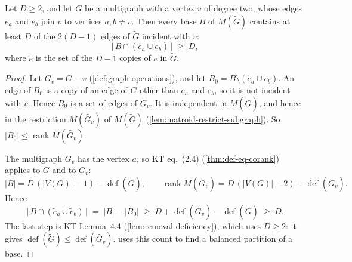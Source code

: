 \begin{lemma}
  \label{lem:base-vfiber-count}
  \leanok
  Let $D \ge 2$, and let $G$ be a multigraph with a vertex $v$ of degree
  two, whose edges $e_a$ and $e_b$ join $v$ to vertices $a, b \neq v$.
  Then every base $B$ of $M(\tilde G)$ contains at least $D$ of the
  $2(D - 1)$ edges of $\tilde G$ incident with $v$:
  \[
    \bigl|\, B \cap (\tilde e_a \cup \tilde e_b)\,\bigr| \;\ge\; D,
  \]
  where $\tilde e$ is the set of the $D - 1$ copies of $e$ in
  $\tilde G$.
\end{lemma}
\begin{proof}
  \leanok
  Let $G_v = G - v$ (\cref{def:graph-operations}), and let
  $B_0 = B \setminus (\tilde e_a \cup \tilde e_b)$. An edge of $B_0$ is
  a copy of an edge of $G$ other than $e_a$ and $e_b$, so it is not
  incident with $v$. Hence $B_0$ is a set of edges of
  $\widetilde{G_v}$. It is independent in $M(\tilde G)$, and hence in
  the restriction $M(\widetilde{G_v})$ of $M(\tilde G)$
  (\cref{lem:matroid-restrict-subgraph}). So
  $|B_0| \le \operatorname{rank} M(\widetilde{G_v})$.

  The multigraph $G_v$ has the vertex $a$, so KT eq.~(2.4)
  (\cref{thm:def-eq-corank}) applies to $G$ and to $G_v$:
  \[
    |B| = D\,(|V(G)| - 1) - \operatorname{def}(\tilde G), \qquad
    \operatorname{rank} M(\widetilde{G_v}) = D\,(|V(G)| - 2) -
    \operatorname{def}(\widetilde{G_v}).
  \]
  Hence
  \[
    \bigl|\, B \cap (\tilde e_a \cup \tilde e_b)\,\bigr| \;=\;
    |B| - |B_0| \;\ge\;
    D + \operatorname{def}(\widetilde{G_v}) - \operatorname{def}(\tilde G)
    \;\ge\; D.
  \]
  The last step is KT Lemma~4.4 (\cref{lem:removal-deficiency}), which
  uses $D \ge 2$: it gives
  $\operatorname{def}(\tilde G) \le \operatorname{def}(\widetilde{G_v})$.
   uses this count to find a balanced partition
  of a base.
\end{proof}

